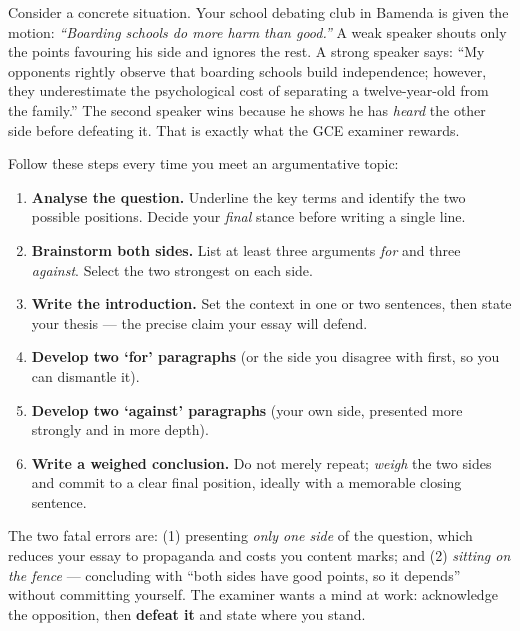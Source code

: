 \documentclass[11pt]{article}
\newcommand{\cle}[1]{{\popxbold\color{popdark}#1}}
\begin{document}
Consider a concrete situation. Your school debating club in Bamenda is given the motion: \emph{``Boarding schools do more harm than good.''} A weak speaker shouts only the points favouring his side and ignores the rest. A strong speaker says: ``My opponents rightly observe that boarding schools build independence; however, they underestimate the psychological cost of separating a twelve-year-old from the family.'' The second speaker wins because he shows he has \emph{heard} the other side before defeating it. That is exactly what the GCE examiner rewards.

\begin{methode}
Follow these steps every time you meet an argumentative topic:
\begin{enumerate}
\item \textbf{Analyse the question.} Underline the key terms and identify the two possible positions. Decide your \emph{final} stance before writing a single line.
\item \textbf{Brainstorm both sides.} List at least three arguments \emph{for} and three \emph{against}. Select the two strongest on each side.
\item \textbf{Write the introduction.} Set the context in one or two sentences, then state your \cle{thesis} --- the precise claim your essay will defend.
\item \textbf{Develop two `for' paragraphs} (or the side you disagree with first, so you can dismantle it).
\item \textbf{Develop two `against' paragraphs} (your own side, presented more strongly and in more depth).
\item \textbf{Write a weighed conclusion.} Do not merely repeat; \emph{weigh} the two sides and commit to a clear final position, ideally with a memorable closing sentence.
\end{enumerate}
\end{methode}

\begin{attention}
The two fatal errors are: (1) presenting \emph{only one side} of the question, which reduces your essay to propaganda and costs you content marks; and (2) \emph{sitting on the fence} --- concluding with ``both sides have good points, so it depends'' without committing yourself. The examiner wants a mind at work: acknowledge the opposition, then \textbf{defeat it} and state where you stand.
\end{attention}
\end{document}
